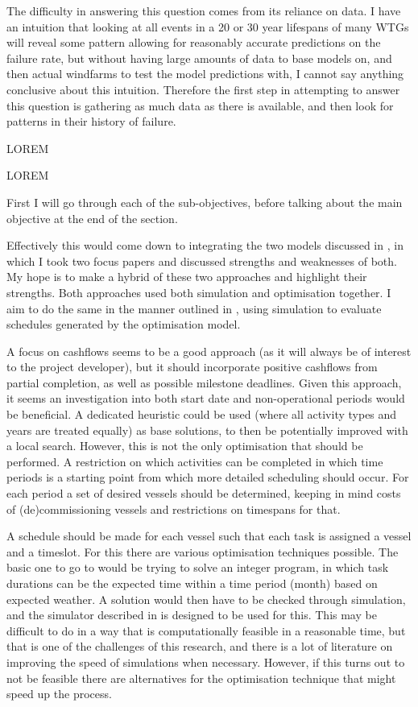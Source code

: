 \documentclass[a4paper,12pt]{article}
\begin{document}
The difficulty in answering this question comes from its reliance on data. I have an intuition that looking at all events in a 20 or 30 year lifespans of many WTGs will reveal some pattern allowing for reasonably accurate predictions on the failure rate, but without having large amounts of data to base models on, and then actual windfarms to test the model predictions with, I cannot say anything conclusive about this intuition. Therefore the first step in attempting to answer this question is gathering as much data as there is available, and then look for patterns in their history of failure. 

\sqc*
LOREM

\rquest*
LOREM

\iffalse
First I will go through each of the sub-objectives, before talking about the main objective at the end of the section. 


Effectively this would come down to integrating the two models discussed in , in which I took two focus papers \cite{barlow2018mixed,kerkhove2017optimised} and discussed strengths and weaknesses of both. My hope is to make a hybrid of these two approaches and highlight their strengths. Both approaches used both simulation and optimisation together. I aim to do the same in the manner outlined in , using simulation to evaluate schedules generated by the optimisation model. 

A focus on cashflows seems to be a good approach (as it will always be of interest to the project developer), but it should incorporate positive cashflows from partial completion, as well as possible milestone deadlines. Given this approach, it seems an investigation into both start date and non-operational periods would be beneficial. A dedicated heuristic  could be used (where all activity types and years are treated equally) as base solutions, to then be potentially improved with a local search. However, this is not the only optimisation that should be performed. A restriction on which activities can be completed in which time periods is a starting point from which more detailed scheduling should occur. For each period a set of desired vessels should be determined, keeping in mind costs of (de)commissioning vessels and restrictions on timespans for that. 

A schedule should be made for each vessel such that each task is assigned a vessel and a timeslot. For this there are various optimisation techniques possible. The basic one to go to would be trying to solve an integer program, in which task durations can be the expected time within a time period (month) based on expected weather. A solution would then have to be checked through simulation, and the simulator described in  is designed to be used for this. This may be difficult to do in a way that is computationally feasible in a reasonable time, but that is one of the challenges of this research, and there is a lot of literature on improving the speed of simulations when necessary. However, if this turns out to not be feasible there are alternatives for the optimisation technique that might speed up the process. 
\end{document}
